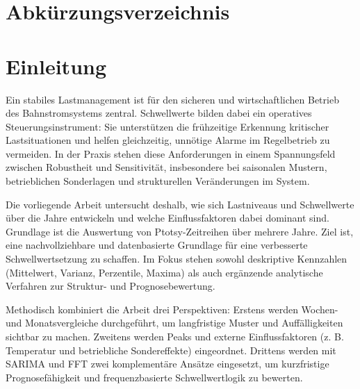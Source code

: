 \documentclass[12pt,oneside]{article}
\begin{document}
\section*{Abkürzungsverzeichnis}
\begin{acronym}[SARIMA]
\end{acronym}
\clearpage
\section{Einleitung}
\label{sec:einleitung}
Ein stabiles Lastmanagement ist für den sicheren und wirtschaftlichen Betrieb
des Bahnstromsystems zentral. Schwellwerte bilden dabei ein operatives
Steuerungsinstrument: Sie unterstützen die frühzeitige Erkennung kritischer
Lastsituationen und helfen gleichzeitig, unnötige Alarme im Regelbetrieb zu
vermeiden. In der Praxis stehen diese Anforderungen in einem Spannungsfeld
zwischen Robustheit und Sensitivität, insbesondere bei saisonalen Mustern,
betrieblichen Sonderlagen und strukturellen Veränderungen im System.

Die vorliegende Arbeit untersucht deshalb, wie sich Lastniveaus und
Schwellwerte über die Jahre entwickeln und welche Einflussfaktoren dabei
dominant sind. Grundlage ist die Auswertung von Ptotsy-Zeitreihen über mehrere
Jahre. Ziel ist, eine nachvollziehbare und datenbasierte Grundlage für eine
verbesserte Schwellwertsetzung zu schaffen. Im Fokus stehen sowohl
deskriptive Kennzahlen (Mittelwert, Varianz, Perzentile, Maxima) als auch
ergänzende analytische Verfahren zur Struktur- und Prognosebewertung.

Methodisch kombiniert die Arbeit drei Perspektiven: Erstens werden
Wochen- und Monatsvergleiche durchgeführt, um langfristige Muster und
Auffälligkeiten sichtbar zu machen. Zweitens werden Peaks und externe
Einflussfaktoren (z. B. Temperatur und betriebliche Sondereffekte) eingeordnet.
Drittens werden mit SARIMA und FFT zwei komplementäre Ansätze eingesetzt,
um kurzfristige Prognosefähigkeit und frequenzbasierte Schwellwertlogik zu
bewerten.
\end{document}
